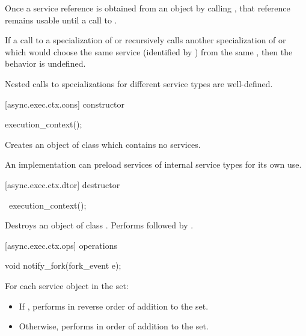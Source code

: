 \pnum
Once a service reference is obtained from an  object by calling , that reference remains usable until a call to .

\pnum
If a call to a specialization of  or 
recursively calls another specialization of  or 
which would choose the same service (identified by ) from the same ,
then the behavior is undefined.
\begin{note}
Nested calls to specializations for different service types are well-defined.
\end{note}

[async.exec.ctx.cons]{ constructor}

%
\begin{itemdecl}
execution_context();
\end{itemdecl}

\begin{itemdescr}
\pnum
\effects Creates an object of class  which contains no services. \begin{note} An implementation can preload services of internal service types for its own use. \end{note}
\end{itemdescr}



[async.exec.ctx.dtor]{ destructor}

%
\begin{itemdecl}
~execution_context();
\end{itemdecl}

\begin{itemdescr}
\pnum
\effects Destroys an object of class . Performs  followed by .
\end{itemdescr}



[async.exec.ctx.ops]{ operations}

%
\begin{itemdecl}
void notify_fork(fork_event e);
\end{itemdecl}

\begin{itemdescr}
\pnum
\effects For each service object  in the set:
\begin{itemize}
\item
 If , performs  in reverse order of addition to the set.
\item
 Otherwise, performs  in order of addition to the set.
\end{itemize}
\end{itemdescr}



